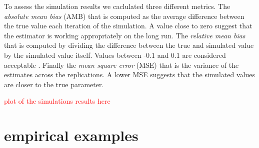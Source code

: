 \documentclass[man]{apa7}
\newcommand{\comment}[1]{
    \begin{center}
        \textcolor{red}{#1}
    \end{center}
}
\begin{document}
To assess the simulation results we caclulated three different metrics. The \textit{absolute mean bias} (AMB) that is computed as the average difference between the true value each iteration of the simulation. A value close to zero suggest that the estimator is working appropriately on the long run. The \textit{relative mean bias} that is computed by dividing the difference between the true and simulated value by the simulated value itself. Values between -0.1 and 0.1 are considered acceptable \cite{Smid2020-ut}. Finally the \textit{mean square error} (MSE) that is the variance of the estimates across the replications. A lower MSE suggests that the simulated values are closer to the true parameter. 

\comment{plot of the simulations results here}

\section{empirical examples}







\end{document}

